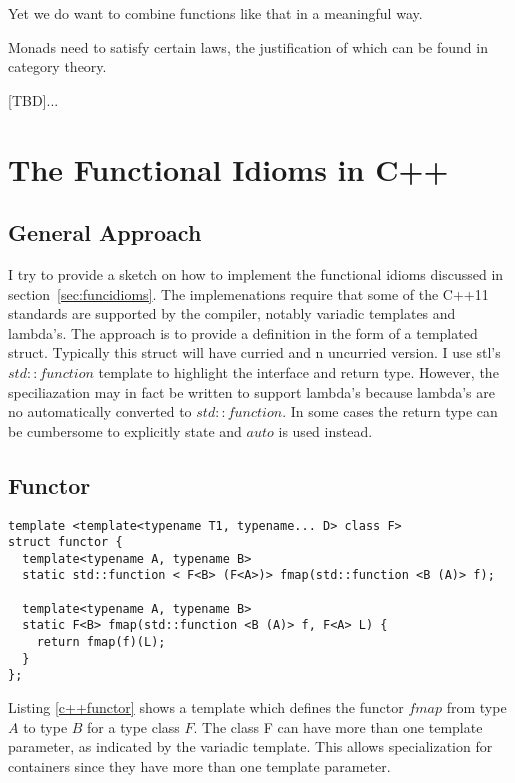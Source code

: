 \documentclass[12pt,fleqn]{article}
\begin{document}
Yet we do want  to combine functions like that in a meaningful way. 

Monads need to satisfy certain laws, the justification of which can be found in category theory.

[TBD]...


%
%
\section{The Functional Idioms in C++}
%
%
%

\subsection{General Approach}

I try to provide a sketch on how to implement the functional idioms discussed in section~\ref{sec:funcidioms}.
The implemenations require that some of the C++11 standards are supported by the compiler, notably variadic templates and lambda's.
The approach is to provide a definition in the form of a templated struct. 
Typically this struct will have curried and n uncurried version.
I use stl's $std::function$ template to highlight the interface and return type. 
However, the speciliazation may in fact be written to support lambda's because lambda's are no automatically converted to
$std::function$. 
In some cases the return type can be cumbersome to explicitly state and $auto$ is used instead.


\subsection{Functor}
%
\begin{minipage}{\linewidth}
\begin{lstlisting}[caption=functor in C++, label=c++functor]
template <template<typename T1, typename... D> class F>
struct functor {
  template<typename A, typename B>
  static std::function < F<B> (F<A>)> fmap(std::function <B (A)> f);

  template<typename A, typename B>
  static F<B> fmap(std::function <B (A)> f, F<A> L) {
    return fmap(f)(L);
  }
};
\end{lstlisting}
\end{minipage}
%
%
%
Listing \ref{c++functor} shows a template which defines the functor $fmap$ from type $A$ to type $B$ for a type class $F$. 
The class F can have more than one template parameter, as indicated by the variadic template.
This allows specialization for containers since they have more than one template parameter.
\end{document}
